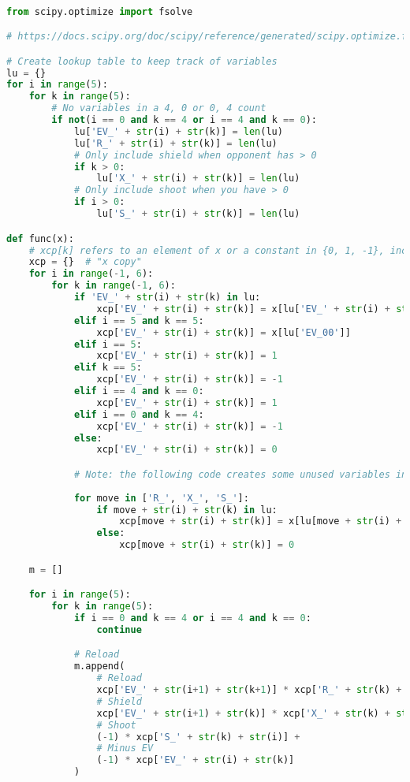 \documentclass[11pt]{article}
\begin{document}
\begin{lstlisting}[language=Python]

from scipy.optimize import fsolve

# https://docs.scipy.org/doc/scipy/reference/generated/scipy.optimize.fsolve.html#scipy.optimize.fsolve

# Create lookup table to keep track of variables
lu = {} 
for i in range(5):
    for k in range(5):
        # No variables in a 4, 0 or 0, 4 count
        if not(i == 0 and k == 4 or i == 4 and k == 0):
            lu['EV_' + str(i) + str(k)] = len(lu)
            lu['R_' + str(i) + str(k)] = len(lu)
            # Only include shield when opponent has > 0
            if k > 0:
                lu['X_' + str(i) + str(k)] = len(lu)
            # Only include shoot when you have > 0
            if i > 0:
                lu['S_' + str(i) + str(k)] = len(lu)

def func(x):
    # xcp[k] refers to an element of x or a constant in {0, 1, -1}, including all combos ([0-6), [0-6))
    xcp = {}  # "x copy"
    for i in range(-1, 6):
        for k in range(-1, 6):
            if 'EV_' + str(i) + str(k) in lu:
                xcp['EV_' + str(i) + str(k)] = x[lu['EV_' + str(i) + str(k)]]
            elif i == 5 and k == 5:
                xcp['EV_' + str(i) + str(k)] = x[lu['EV_00']]
            elif i == 5:
                xcp['EV_' + str(i) + str(k)] = 1
            elif k == 5:
                xcp['EV_' + str(i) + str(k)] = -1
            elif i == 4 and k == 0:
                xcp['EV_' + str(i) + str(k)] = 1
            elif i == 0 and k == 4:
                xcp['EV_' + str(i) + str(k)] = -1
            else:
                xcp['EV_' + str(i) + str(k)] = 0

            # Note: the following code creates some unused variables in counts containing 5
            
            for move in ['R_', 'X_', 'S_']:
                if move + str(i) + str(k) in lu:
                    xcp[move + str(i) + str(k)] = x[lu[move + str(i) + str(k)]]
                else:
                    xcp[move + str(i) + str(k)] = 0

    m = []

    for i in range(5):
        for k in range(5):
            if i == 0 and k == 4 or i == 4 and k == 0:
                continue

            # Reload
            m.append(
                # Reload
                xcp['EV_' + str(i+1) + str(k+1)] * xcp['R_' + str(k) + str(i)] +
                # Shield
                xcp['EV_' + str(i+1) + str(k)] * xcp['X_' + str(k) + str(i)] +
                # Shoot
                (-1) * xcp['S_' + str(k) + str(i)] +
                # Minus EV
                (-1) * xcp['EV_' + str(i) + str(k)]
            )


\end{lstlisting}
\end{document}
